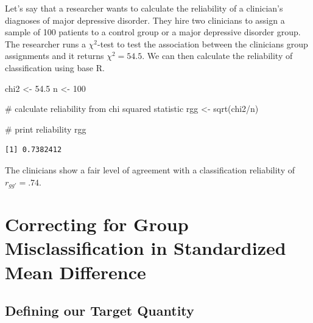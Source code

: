 \documentclass[
  letterpaper,
  DIV=11,
  numbers=noendperiod]{scrreprt}
\newenvironment{Shaded}{}{}
\newcommand{\CommentTok}[1]{\textcolor[rgb]{0.54,0.53,0.53}{#1}}
\newcommand{\DecValTok}[1]{\textcolor[rgb]{0.69,0.50,0.00}{#1}}
\newcommand{\FloatTok}[1]{\textcolor[rgb]{0.69,0.50,0.00}{#1}}
\newcommand{\FunctionTok}[1]{\textcolor[rgb]{0.39,0.29,0.61}{#1}}
\newcommand{\NormalTok}[1]{\textcolor[rgb]{0.12,0.11,0.11}{#1}}
\newcommand{\OtherTok}[1]{\textcolor[rgb]{0.00,0.43,0.16}{#1}}
\newcommand{\SpecialCharTok}[1]{\textcolor[rgb]{0.24,0.68,0.91}{#1}}
\begin{document}
\begin{tcolorbox}[enhanced jigsaw, toptitle=1mm, titlerule=0mm, arc=.35mm, breakable, colframe=quarto-callout-note-color-frame, title={Applied Example in R}, opacitybacktitle=0.6, opacityback=0, colbacktitle=quarto-callout-note-color!10!white, coltitle=black, bottomtitle=1mm, colback=white, bottomrule=.15mm, rightrule=.15mm, toprule=.15mm, leftrule=.75mm, left=2mm]

Let's say that a researcher wants to calculate the reliability of a
clinician's diagnoses of major depressive disorder. They hire two
clinicians to assign a sample of 100 patients to a control group or a
major depressive disorder group. The researcher runs a \(\chi^2\)-test
to test the association between the clinicians group assignments and it
returns \(\chi^2=54.5\). We can then calculate the reliability of
classification using base R.

\begin{Shaded}
\begin{Highlighting}[]
\NormalTok{chi2 }\OtherTok{\textless{}{-}} \FloatTok{54.5}
\NormalTok{n }\OtherTok{\textless{}{-}} \DecValTok{100}

\CommentTok{\# calculate reliability from chi squared statistic}
\NormalTok{rgg }\OtherTok{\textless{}{-}} \FunctionTok{sqrt}\NormalTok{(chi2}\SpecialCharTok{/}\NormalTok{n)}

\CommentTok{\# print reliability}
\NormalTok{rgg}
\end{Highlighting}
\end{Shaded}

\begin{verbatim}
[1] 0.7382412
\end{verbatim}

The clinicians show a fair level of agreement with a classification
reliability of \(r_{gg'}=.74\).

\end{tcolorbox}

\hypertarget{correcting-for-group-misclassification-in-standardized-mean-difference}{%
\section{Correcting for Group Misclassification in Standardized Mean
Difference}\label{correcting-for-group-misclassification-in-standardized-mean-difference}}

\hypertarget{defining-our-target-quantity}{%
\subsection{Defining our Target
Quantity}\label{defining-our-target-quantity}}
\end{document}
